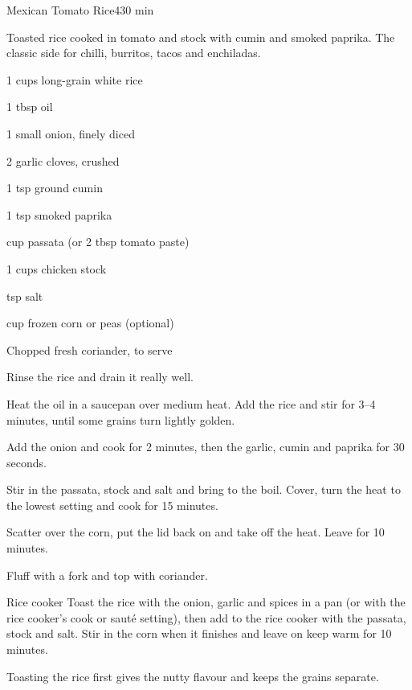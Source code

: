 \begin{recipebox}{Mexican Tomato Rice}{4}{30 min}

Toasted rice cooked in tomato and stock with cumin and smoked paprika. The
classic side for chilli, burritos, tacos and enchiladas.

\begin{ingredients}
  \item 1 cups long-grain white rice
  \item 1 tbsp oil
  \item 1 small onion, finely diced
  \item 2 garlic cloves, crushed
  \item 1 tsp ground cumin
  \item 1 tsp smoked paprika
  \item {} cup passata (or 2 tbsp tomato paste)
  \item 1 cups chicken stock
  \item {} tsp salt
  \item {} cup frozen corn or peas (optional)
  \item Chopped fresh coriander, to serve
\end{ingredients}

\begin{method}
  \item Rinse the rice and drain it really well.
  \item Heat the oil in a saucepan over medium heat. Add the rice and stir for 3--4 minutes, until some grains turn lightly golden.
  \item Add the onion and cook for 2 minutes, then the garlic, cumin and paprika for 30 seconds.
  \item Stir in the passata, stock and salt and bring to the boil. Cover, turn the heat to the lowest setting and cook for 15 minutes.
  \item Scatter over the corn, put the lid back on and take off the heat. Leave for 10 minutes.
  \item Fluff with a fork and top with coriander.
\end{method}

\begin{variationbox}{Rice cooker}
Toast the rice with the onion, garlic and spices in a pan (or with the rice cooker's cook or sauté setting), then add to the rice cooker with the passata, stock and salt. Stir in the corn when it finishes and leave on keep warm for 10 minutes.
\end{variationbox}

\begin{notelist}
  \item Toasting the rice first gives the nutty flavour and keeps the grains separate.
\end{notelist}

\end{recipebox}
